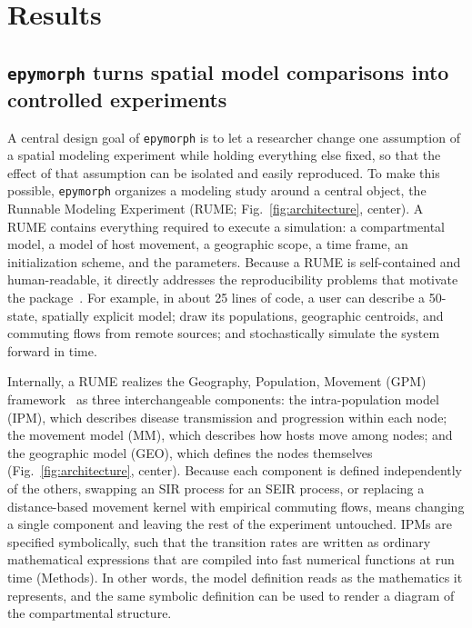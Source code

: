 \section{Results}\label{sec:results}

\subsection{\texttt{epymorph} turns spatial model comparisons into controlled experiments}\label{sec:results-architecture}

A central design goal of \texttt{epymorph} is to let a researcher change one assumption of a spatial modeling experiment while holding everything else fixed, so that the effect of that assumption can be isolated and easily reproduced. 
To make this possible, \texttt{epymorph} organizes a modeling study around a central object, the Runnable Modeling Experiment (RUME; Fig.~\ref{fig:architecture}, center). 
A RUME contains everything required to execute a simulation: a compartmental model, a model of host movement, a geographic scope, a time frame, an initialization scheme, and the parameters. 
Because a RUME is self-contained and human-readable, it directly addresses the reproducibility problems that motivate the package~\citep{oshinubi_systematic_2026}. 
For example, in about 25 lines of code, a user can describe a 50-state, spatially explicit model; draw its populations, geographic centroids, and commuting flows from remote sources; and stochastically simulate the system forward in time.

Internally, a RUME realizes the Geography, Population, Movement (GPM) framework~\citep{oshinubi_systematic_2026} as three interchangeable components: the intra-population model (IPM), which describes disease transmission and progression within each node; the movement model (MM), which describes how hosts move among nodes; and the geographic model (GEO), which defines the nodes themselves (Fig.~\ref{fig:architecture}, center). 
Because each component is defined independently of the others, swapping an SIR process for an SEIR process, or replacing a distance-based movement kernel with empirical commuting flows, means changing a single component and leaving the rest of the experiment untouched. 
IPMs are specified symbolically, such that the transition rates are written as ordinary mathematical expressions that are compiled into fast numerical functions at run time (Methods). 
In other words, the model definition reads as the mathematics it represents, and the same symbolic definition can be used to render a diagram of the compartmental structure.

